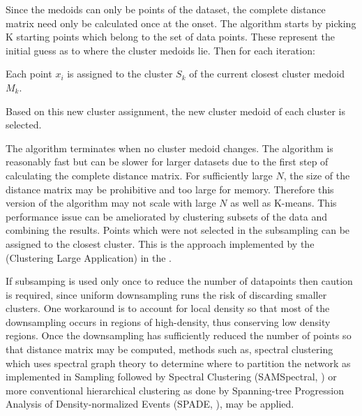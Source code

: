 Since the medoids can only be points of the dataset, the complete distance matrix need only be calculated once at the onset.
The algorithm starts by picking K starting points which belong to the set of data points.
These represent the initial guess as to where the cluster medoids lie.
Then for each iteration:
\begin{itemise}
    \item Each point $x_i$ is assigned to the cluster $S_k$ of the current closest cluster medoid $M_k$.
    \item Based on this new cluster assignment, the new cluster medoid of each cluster is selected.
\end{itemise}
The algorithm terminates when no cluster medoid changes.
The algorithm is reasonably fast but can be slower for larger datasets due to the first step of calculating the complete distance matrix.
For sufficiently large $N$, the size of the distance matrix may be prohibitive and too large for memory.
Therefore this version of the algorithm may not scale with large $N$ as well as K-means. 
This performance issue can be ameliorated by clustering subsets of the data and combining the results.
Points which were not selected in the subsampling can be assigned to the closest cluster. 
This is the approach implemented by the  (Clustering Large Application) in the .


If subsamping is used only once to reduce the number of datapoints then 
caution is required, since uniform downsampling runs the risk of discarding smaller clusters.
One workaround is to account for local density so that most of the downsampling occurs in regions of high-density,
thus conserving low density regions.
Once the downsampling has sufficiently reduced the number of points so that distance matrix may be computed,
methods such as, spectral clustering which uses spectral graph theory to determine where to partition the network
as implemented in Sampling followed by Spectral Clustering (SAMSpectral, \citet{Zare:2010cw}) or more conventional hierarchical clustering
as done by Spanning-tree Progression Analysis of Density-normalized Events (SPADE, \citet{Simonds:2011jh}), may be applied.


